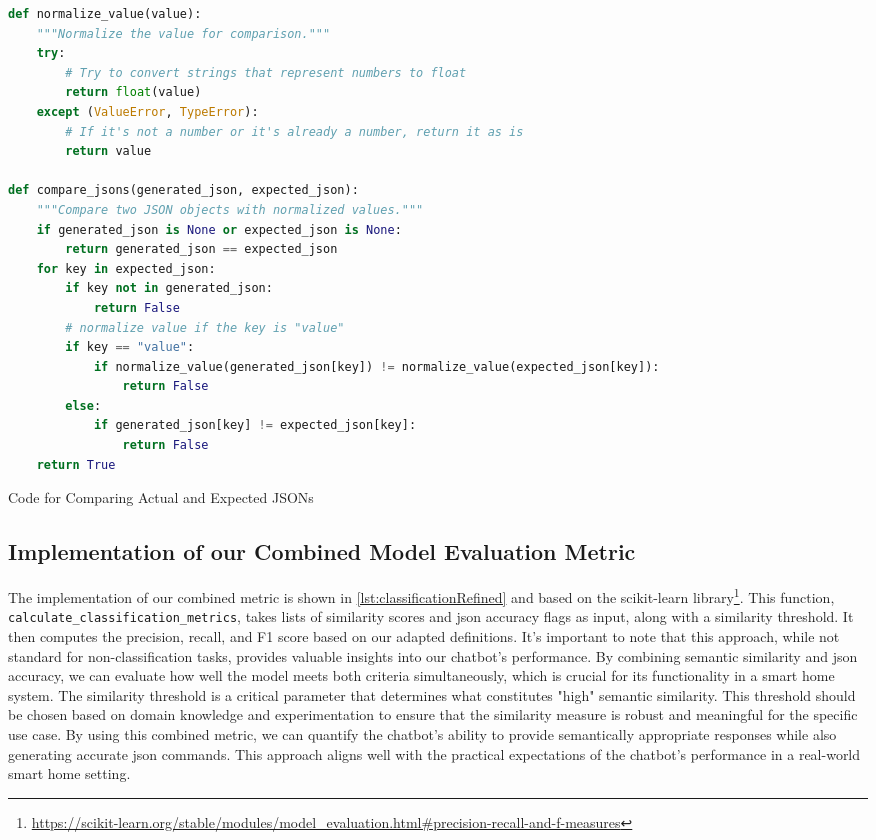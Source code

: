 \begin{Listing}
    \begin{lstlisting}[language=Python]
def normalize_value(value):
    """Normalize the value for comparison."""
    try:
        # Try to convert strings that represent numbers to float
        return float(value)
    except (ValueError, TypeError):
        # If it's not a number or it's already a number, return it as is
        return value

def compare_jsons(generated_json, expected_json):
    """Compare two JSON objects with normalized values."""
    if generated_json is None or expected_json is None:
        return generated_json == expected_json
    for key in expected_json:
        if key not in generated_json:
            return False
        # normalize value if the key is "value"
        if key == "value":
            if normalize_value(generated_json[key]) != normalize_value(expected_json[key]):
                return False
        else:
            if generated_json[key] != expected_json[key]:
                return False
    return True
    \end{lstlisting}
    \caption{Code for Comparing Actual and Expected JSONs}
    \label{lst:compare-json}   
\end{Listing}



\subsection{Implementation of our Combined Model Evaluation Metric}
\label{sec:impl-combinedeval}
The implementation of our combined metric is shown in \cref{lst:classificationRefined} and based on the scikit-learn library\footnote{\url{https://scikit-learn.org/stable/modules/model\_evaluation.html\#precision-recall-and-f-measures}}. This function, \texttt{calculate\_classification\_metrics}, takes lists of similarity scores and \gls{json} accuracy flags as input, along with a similarity threshold. It then computes the precision, recall, and F1 score based on our adapted definitions.
It's important to note that this approach, while not standard for non-classification tasks, provides valuable insights into our chatbot's performance. By combining semantic similarity and \gls{json} accuracy, we can evaluate how well the model meets both criteria simultaneously, which is crucial for its functionality in a smart home system.
The similarity threshold is a critical parameter that determines what constitutes "high" semantic similarity. This threshold should be chosen based on domain knowledge and experimentation to ensure that the similarity measure is robust and meaningful for the specific use case.
By using this combined metric, we can quantify the chatbot's ability to provide semantically appropriate responses while also generating accurate \gls{json} commands. This approach aligns well with the practical expectations of the chatbot's performance in a real-world smart home setting.

